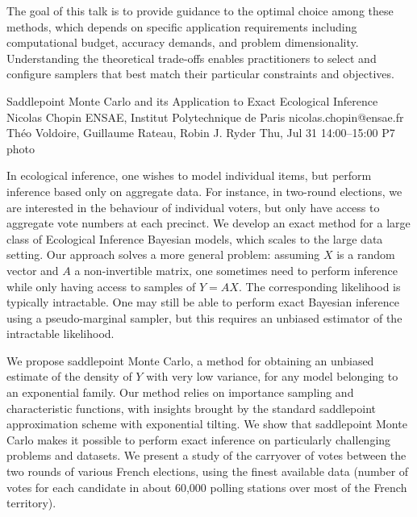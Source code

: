 \documentclass[12pt,lettersize,oneside]{book} %
\begin{document}
\begin{talk}
The goal of this talk is to provide
guidance to 
the optimal choice among these methods, which depends on specific application requirements including computational budget, accuracy demands, and problem dimensionality. Understanding the theoretical trade-offs enables practitioners to select and configure samplers that best match their particular constraints and objectives.

\vspace{-10ex}
\end{talk}

\clearpage
\begin{talk}
  {Saddlepoint Monte Carlo and its Application to Exact Ecological Inference}%
  {Nicolas Chopin}%
  {ENSAE, Institut Polytechnique de Paris}%
  {nicolas.chopin@ensae.fr}%
  {Th\'eo Voldoire, Guillaume Rateau, Robin J. Ryder}%
  {}%
  {Thu, Jul 31 14:00--15:00}%
  {P7}%
  {photo}%
  
    
   

In ecological inference, one wishes to model individual items, but perform
inference based only on aggregate data.  For instance, in two-round elections,
we are interested in the behaviour of individual voters, but only have access to
aggregate vote numbers at each precinct.  We develop an exact method for a
large class of Ecological Inference Bayesian models, which scales  to the large
data setting.  Our approach solves a more general problem:  assuming $X$ is a
random vector and $A$ a non-invertible matrix, one sometimes need to perform
inference while only having access to samples of $Y=AX$. The corresponding
likelihood is typically intractable. One may still be able to perform exact
Bayesian inference using a pseudo-marginal sampler, but this requires an
unbiased estimator of the intractable likelihood.

We propose saddlepoint Monte Carlo, a method for obtaining an unbiased estimate
of the density of $Y$ with very low variance, for any model belonging to an
exponential family. Our method relies on importance sampling and 
characteristic functions, with insights brought by the standard saddlepoint
approximation scheme with exponential tilting.  We show that saddlepoint Monte
Carlo makes it possible to perform exact inference on particularly challenging
problems and datasets.  We present a study of the carryover of votes between
the two rounds of various French elections, using the finest available data
(number of votes for each candidate in about 60,000 polling stations over most
of the French territory). 


\end{talk}
\end{document}
